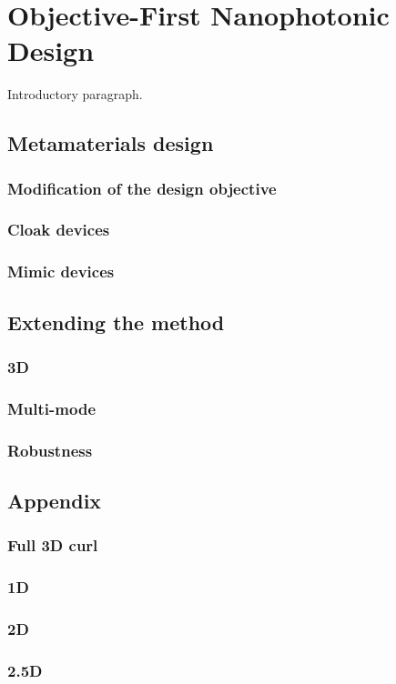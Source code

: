 \newcommand{\BE}{\begin{equation}}
\newcommand{\EE}{\end{equation}}
\newcommand{\BA}{\begin{eqnarray}}
\newcommand{\EA}{\end{eqnarray}}
\newcommand{\curl}{\nabla\times}
\newcommand{\minimize}[1]{\JLUminimize_{#1}\;&}
\newcommand{\subto}{\text{subject to}\;&}
\newcommand{\myfig}[2]{\begin{figure}[!h]\texttt{[image: fig/\#1]}\caption{#2}\label{#1}\end{figure}}

\chapter{Objective-First Nanophotonic Design}
\label{intro}


Introductory paragraph.







\section{Metamaterials design}
\subsection{Modification of the design objective}
\subsection{Cloak devices}
\subsection{Mimic devices}

\section{Extending the method}
\subsection{3D}
\subsection{Multi-mode}
\subsection{Robustness}


\section{Appendix}
\subsection{Full 3D curl}
\subsection{1D}
\subsection{2D}
\subsection{2.5D}
